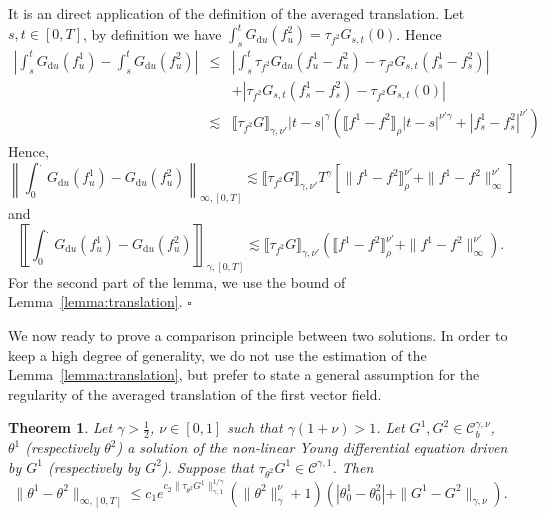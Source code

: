 \documentclass[a4paper,11pt]{article}
\newcommand{\mathd}{\mathrm{d}}
\newtheorem{theorem}{Theorem}[section]
\newenvironment{proof}{{\sc Proof.}}{\hfill$\square$}
\newcommand{\CC}{\mathscr C}
\begin{document}
\begin{proof}
  It is an direct application of the definition of the averaged translation.
  Let $s,t \in [ 0,T ]$, by definition we have $\int_{s}^{t} G_{\mathd u} (
  f^{2}_{u} ) = \tau_{f^{2}} G_{s,t} ( 0 )$. Hence
  \begin{eqnarray*}
    \left\lvert \int_{s}^{t} G_{\mathd u} ( f^{1}_{u} ) - \int_{s}^{t} G_{\mathd u}
    ( f^{2}_{u} ) \right\lvert & \leqslant & \left\lvert \int_{s}^{t} \tau_{f^{2}}
    G_{\mathd u} ( f^{1}_{u} -f^{2}_{u} ) - \tau_{f^{2}} G_{s,t} ( f^{1}_{s}
    -f^{2}_{s} ) \right\lvert\\
    &  & + | \tau_{f^{2}} G_{s,t} ( f^{1}_{s} -f^{2}_{s} ) - \tau_{f^{2}}
    G_{s,t} ( 0 ) |\\
    & \lesssim & \llbracket \tau_{f^{2}} G \rrbracket_{\gamma , \nu'} | t-s
    |^{\gamma} ( \llbracket f^{1} -f^{2} \rrbracket_{\rho} | t-s |^{\nu'
    \gamma} + | f_{s}^{1} -f_{s}^{2} |^{\nu'} )
  \end{eqnarray*}
  Hence,
  \[ \left\| \int_{0}^{.} G_{\mathd u} ( f^{1}_{u} ) -G_{\mathd u} ( f^{2}_{u}
     ) \right\|_{\infty , [ 0,T ]} \lesssim \llbracket \tau_{f^{2}} G
     \rrbracket_{\gamma , \nu'} T^{\gamma} [ \| f^{1} -f^{2}
     \rrbracket^{\nu'}_{\rho} + \| f^{1} -f^{2} \|^{\nu'}_{\infty} ] \]
  and
  \[ \left\llbracket \int_{0}^{.} G_{\mathd u} ( f^{1}_{u} ) -G_{\mathd u} (
     f^{2}_{u} ) \right\rrbracket_{\gamma , [ 0,T ]} \lesssim \llbracket
     \tau_{f^{2}} G \rrbracket_{\gamma , \nu'} ( \llbracket f^{1} -f^{2}
     \rrbracket^{\nu'}_{\rho} + \| f^{1} -f^{2} \|^{\nu'}_{\infty} ) . \]
  For the second part of the lemma, we use the bound of
  Lemma~\ref{lemma:translation}.
\end{proof}

We now ready to prove a comparison principle between two solutions. In order
to keep a high degree of generality, we do not use the estimation of the
Lemma~\ref{lemma:translation}, but prefer to state a general assumption for
the regularity of the averaged translation of the first vector field.

\begin{theorem}
  \label{theorem:comparison}Let $\gamma > \frac{1}{2}$, $\nu \in [ 0,1 ]$ such
  that $\gamma ( 1+ \nu ) >1$. Let $G^{1} ,G^{2} \in \CC_{b}^{\gamma , \nu}$,
  $\theta^{1}$ (respectively $\theta^{2}$) a solution of the non-linear Young
  differential equation driven by $G^{1}$ (respectively by $G^{2}$). Suppose
  that $\tau_{\theta^{2}} G^{1} \in \CC^{\gamma ,1}$. Then
  \[ \| \theta^{1} - \theta^{2} \|_{\infty , [ 0,T ]} \leqslant c_{1}
     e^{c_{2} \| \tau_{\theta^{2}} G^{1} \|_{\gamma ,1}^{1/ \gamma}} ( \|
     \theta^{2} \|^{\nu}_{\gamma} +1 ) ( | \theta^{1}_{0} - \theta^{2}_{0} | +
     \| G^{1} -G^{2} \|_{\gamma , \nu} ) . \]
\end{theorem}
\end{document}
